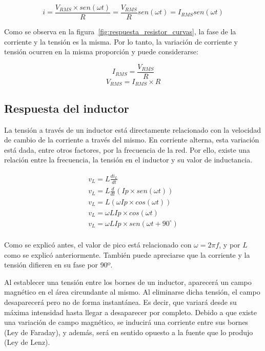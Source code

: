 $$ i = \frac{V_{RMS} \times sen(\omega t)}{R} = \frac{V_{RMS}}{R} sen(\omega t) = I_{RMS} sen(\omega t) $$

Como se observa en la figura~\ref{fig:respuesta_resistor_curvas}, la fase de la corriente y la tensión es la misma. Por lo tanto, la variación de corriente y tensión ocurren en la misma proporción y puede considerarse:

\begin{equation}
	\label{eq:i_resistor_alterna}
	I_{RMS} = \frac{V_{RMS}}{R}
\end{equation}
\begin{equation}
	\label{eq:i_resistor_alterna}
	V_{RMS} = I_{RMS}\times R
\end{equation}

\subsection{Respuesta del inductor}

La tensión a través de un inductor está directamente relacionado con la velocidad de cambio de la corriente a través del mismo. En corriente alterna, esta variación está dada, entre otros factores, por la frecuencia de la red. Por ello, existe una relación entre la frecuencia, la tensión en el inductor y su valor de inductancia.

\begin{eqnarray*}
	v_L = L \frac{di_L}{dt} \\
	v_L = L \frac{d}{dt}(Ip\times sen(\omega t)) \\
	v_L = L( \omega Ip\times cos (\omega t)) \\
	v_L = \omega L Ip\times cos(\omega t) \\
	v_L = \omega L Ip\times sen(\omega t +90^{\circ}) \\
\end{eqnarray*}

Como se explicó antes, el valor de pico está relacionado con $\omega=2\pi f$, y por $L$ como se explicó anteriormente. También puede apreciarse que la corriente y la tensión difieren en su fase por 90º.

Al establecer una tensión entre los bornes de un inductor, aparecerá un campo magnético en el área circundante al mismo. Al eliminarse dicha tensión, el campo desaparecerá pero no de forma instantánea. Es decir, que variará desde su máxima intensidad hasta llegar a desaparecer por completo. Debido a que existe una variación de campo magnético, se inducirá una corriente entre sus bornes (Ley de Faraday), y además, será en sentido opuesto a la fuente que lo produjo (Ley de Lenz).

